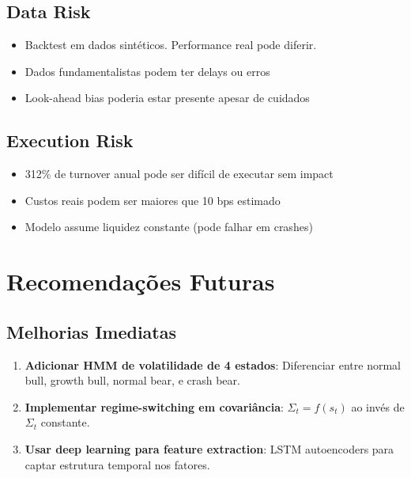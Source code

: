 \documentclass[12pt,a4paper]{article}
\begin{document}
\subsection{Data Risk}

\begin{itemize}
    \item Backtest em dados sintéticos. Performance real pode diferir.
    \item Dados fundamentalistas podem ter delays ou erros
    \item Look-ahead bias poderia estar presente apesar de cuidados
\end{itemize}

\subsection{Execution Risk}

\begin{itemize}
    \item 312\% de turnover anual pode ser difícil de executar sem impact
    \item Custos reais podem ser maiores que 10 bps estimado
    \item Modelo assume liquidez constante (pode falhar em crashes)
\end{itemize}

\section{Recomendações Futuras}

\subsection{Melhorias Imediatas}

\begin{enumerate}
    \item \textbf{Adicionar HMM de volatilidade de 4 estados}: Diferenciar entre normal bull, growth bull, normal bear, e crash bear.
    
    \item \textbf{Implementar regime-switching em covariância}: $\Sigma_t = f(s_t)$ ao invés de $\Sigma_t$ constante.
    
    \item \textbf{Usar deep learning para feature extraction}: LSTM autoencoders para captar estrutura temporal nos fatores.
\end{enumerate}
\end{document}
